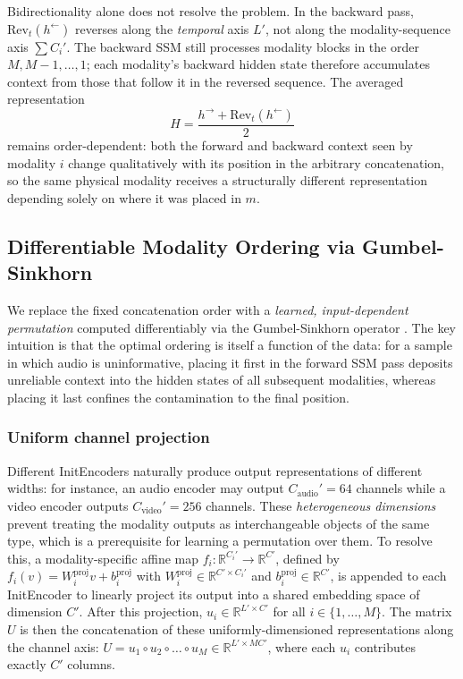\documentclass[11pt,a4paper]{article}
\newcommand{\R}{\mathbb{R}}
\begin{document}
	Bidirectionality alone does not resolve the problem. In the backward pass, $\text{Rev}_t(h^{\leftarrow})$ reverses along the \emph{temporal} axis $L'$, not along the modality-sequence axis $\sum C_i'$. The backward SSM still processes modality blocks in the order $M, M{-}1, \dots, 1$; each modality's backward hidden state therefore accumulates context from those that follow it in the reversed sequence. The averaged representation
	$$H = \frac{h^{\rightarrow} + \text{Rev}_t(h^{\leftarrow})}{2}$$
	remains order-dependent: both the forward and backward context seen by modality $i$ change qualitatively with its position in the arbitrary concatenation, so the same physical modality receives a structurally different representation depending solely on where it was placed in $m$.
	
	\subsection{Differentiable Modality Ordering via Gumbel-Sinkhorn}
	
	We replace the fixed concatenation order with a \emph{learned, input-dependent permutation} computed differentiably via the Gumbel-Sinkhorn operator \cite{mena2018}. The key intuition is that the optimal ordering is itself a function of the data: for a sample in which audio is uninformative, placing it first in the forward SSM pass deposits unreliable context into the hidden states of all subsequent modalities, whereas placing it last confines the contamination to the final position.
	
	\subsubsection*{Uniform channel projection}
	Different InitEncoders naturally produce output representations of different widths: for instance, an audio encoder may output $C_{\text{audio}}' = 64$ channels while a video encoder outputs $C_{\text{video}}' = 256$ channels. These \emph{heterogeneous dimensions} prevent treating the modality outputs as interchangeable objects of the same type, which is a prerequisite for learning a permutation over them. To resolve this, a modality-specific affine map $f_i : \R^{C_i'} \to \R^{C'}$, defined by $f_i(v) = W_i^{\text{proj}} v + b_i^{\text{proj}}$ with $W_i^{\text{proj}} \in \R^{C' \times C_i'}$ and $b_i^{\text{proj}} \in \R^{C'}$, is appended to each InitEncoder to linearly project its output into a shared embedding space of dimension $C'$. After this projection, $u_i \in \R^{L' \times C'}$ for all $i \in \{1,\dots,M\}$. The matrix $U$ is then the concatenation of these uniformly-dimensioned representations along the channel axis: $U = u_1 \circ u_2 \circ \dots \circ u_M \in \R^{L' \times MC'}$, where each $u_i$ contributes exactly $C'$ columns.
	
\end{document}
